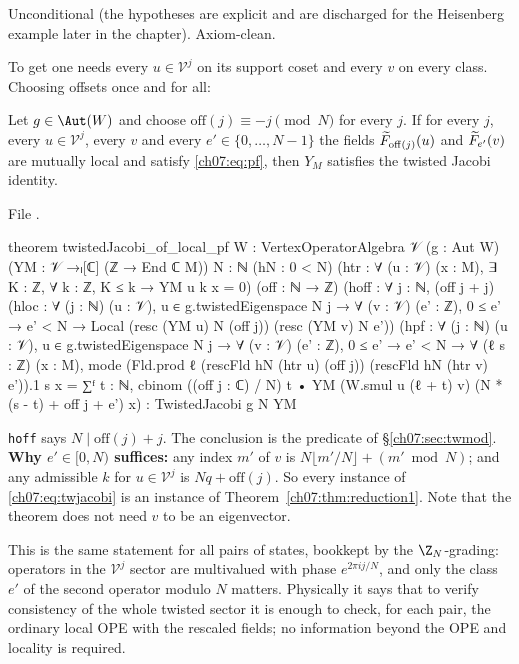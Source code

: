 \begin{status}
Unconditional (the hypotheses are explicit and are discharged for the Heisenberg example later
in the chapter). Axiom-clean.
\end{status}

To get  one needs every $u\in\mathcal V^j$ on its support coset and every $v$
on every class. Choosing offsets once and for all:

\begin{theorem}\label{ch07:thm:reduction}
Let $g\in\Aut(W)$ and choose $\mathrm{off}(j)\equiv -j\pmod N$ for every $j$. If for every $j$,
every $u\in\mathcal V^j$, every $v$ and every $e'\in\{0,\dots,N-1\}$ the fields
$\widetilde{F}_{\mathrm{off}(j)}(u)$ and $\widetilde{F}_{e'}(v)$ are mutually local and satisfy
\eqref{ch07:eq:pf}, then $Y_M$ satisfies the twisted Jacobi identity.
\end{theorem}

\noindent File .
\begin{leancode}
theorem twistedJacobi_of_local_pf {W : VertexOperatorAlgebra 𝒱} (g : Aut W)
    (YM : 𝒱 →ₗ[ℂ] (ℤ → End ℂ M)) {N : ℕ} (hN : 0 < N)
    (htr : ∀ (u : 𝒱) (x : M), ∃ K : ℤ, ∀ k : ℤ, K ≤ k → YM u k x = 0)
    (off : ℕ → ℤ) (hoff : ∀ j : ℕ, (off j + j) %
    (hloc : ∀ (j : ℕ) (u : 𝒱), u ∈ g.twistedEigenspace N j → ∀ (v : 𝒱) (e' : ℤ),
      0 ≤ e' → e' < N → Local (resc (YM u) N (off j)) (resc (YM v) N e'))
    (hpf : ∀ (j : ℕ) (u : 𝒱), u ∈ g.twistedEigenspace N j → ∀ (v : 𝒱) (e' : ℤ),
      0 ≤ e' → e' < N → ∀ (ℓ s : ℤ) (x : M),
      mode (Fld.prod ℓ (rescFld hN (htr u) (off j)) (rescFld hN (htr v) e')).1 s x
        = ∑ᶠ t : ℕ, cbinom ((off j : ℂ) / N) t •
            YM (W.smul u (ℓ + t) v) (N * (s - t) + off j + e') x) :
    TwistedJacobi g N YM
\end{leancode}

\begin{dictionary}
\verb|hoff| says $N\mid \mathrm{off}(j)+j$. The conclusion is the predicate of
\S\ref{ch07:sec:twmod}. \textbf{Why $e'\in[0,N)$ suffices:} any index $m'$ of $v$ is
$N\lfloor m'/N\rfloor + (m'\bmod N)$; and any admissible $k$ for $u\in\mathcal V^j$ is
$N q+\mathrm{off}(j)$. So every instance of \eqref{ch07:eq:twjacobi} is an instance of
Theorem~\ref{ch07:thm:reduction1}. Note that the theorem does not need $v$ to be an eigenvector.
\end{dictionary}

\begin{physics}
This is the same statement for all pairs of states, bookkept by the $\Z_N$-grading: operators in the $\mathcal V^j$ sector are multivalued with phase $e^{2\pi ij/N}$, and only the class $e'$ of the second operator modulo $N$ matters. Physically it says that to verify consistency of the whole twisted sector it is enough to check, for each pair, the ordinary local OPE with the rescaled fields; no information beyond the OPE and locality is required.
\end{physics}

